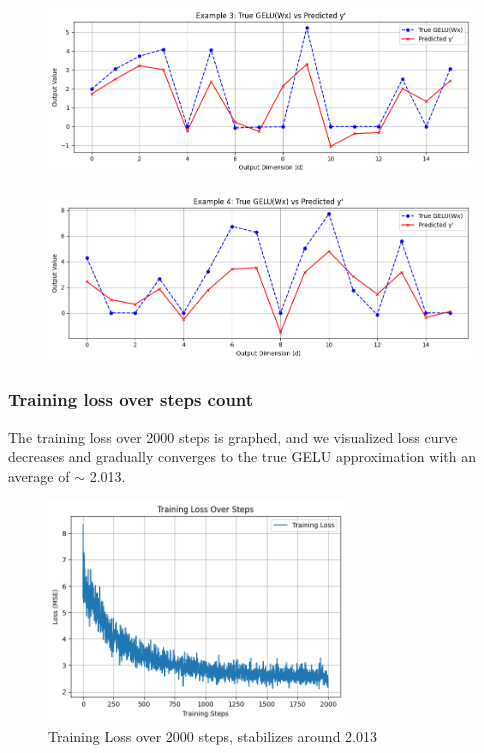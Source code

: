 \documentclass{article}
\begin{document}
\begin{figure}
    \centering
    \includegraphics[width=1\linewidth]{example3.png}
    \label{fig:enter-label}
\end{figure}

\begin{figure}
    \centering
    \includegraphics[width=1\linewidth]{example4.png}
    \label{fig:enter-label}
\end{figure}

\subsubsection{Training loss over steps count}
The training loss over 2000 steps is graphed, and we visualized loss curve decreases and gradually converges to the true GELU approximation with an average of $\sim$ 2.013.

\begin{figure}[h]
    \centering
    \includegraphics[width=0.7\textwidth]{training_loss.png}
    \caption{Training Loss over 2000 steps, stabilizes around 2.013}
    \label{fig:enter-label}
\end{figure}
\end{document}
